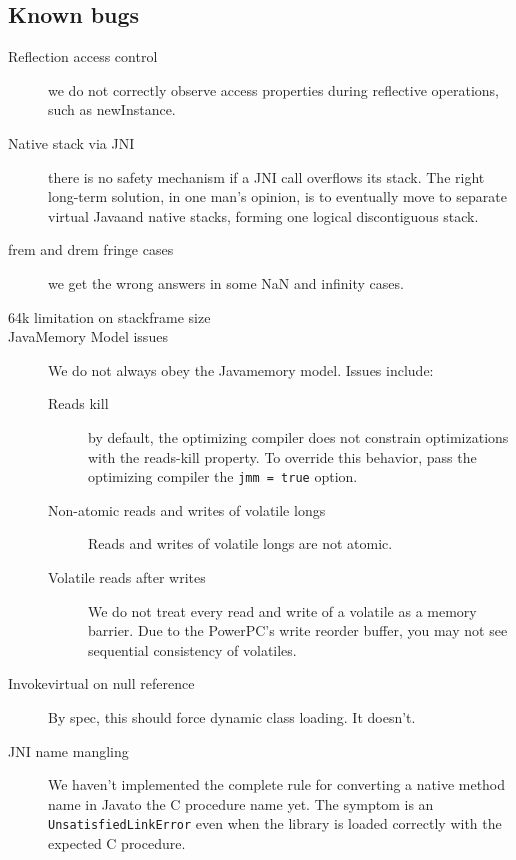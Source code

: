 \subsection{Known bugs}
\begin{description}
\item [Reflection access control] we do not correctly observe access properties during reflective operations, such as newInstance.
\item [Native stack via JNI]  there is no safety mechanism if a JNI call overflows its stack.
The right long-term solution, in one man's opinion, is to eventually move
to separate virtual Java\trademark and native stacks, forming one logical discontiguous stack.
\item[frem and drem fringe cases] we get the wrong answers in some
NaN and infinity cases.
\item[64k limitation on stackframe size] 
\item[Java\trademark Memory Model issues] We do not always obey the Java\trademark memory model.  Issues include:
\begin{description}
\item [Reads kill] by default, the optimizing compiler does not constrain optimizations with the reads-kill property.  To override this behavior, pass the optimizing compiler the {\tt jmm = true} option.
\item [Non-atomic reads and writes of volatile longs] Reads and writes of volatile longs are not atomic.
\item [Volatile reads after writes]  We do not treat every read and write of a volatile as a memory barrier.  Due to the PowerPC's write reorder buffer, you may
not see sequential consistency of volatiles.
\end{description}
\item[Invokevirtual on null reference] By spec, this should force dynamic class loading.  It doesn't.
\item[JNI name mangling]  We haven't implemented the complete
  rule for converting a native method name in Java\trademark to the C procedure
  name yet.  The symptom is an {\tt UnsatisfiedLinkError} even when the 
  library is loaded correctly with the expected C procedure.

\end{description}
